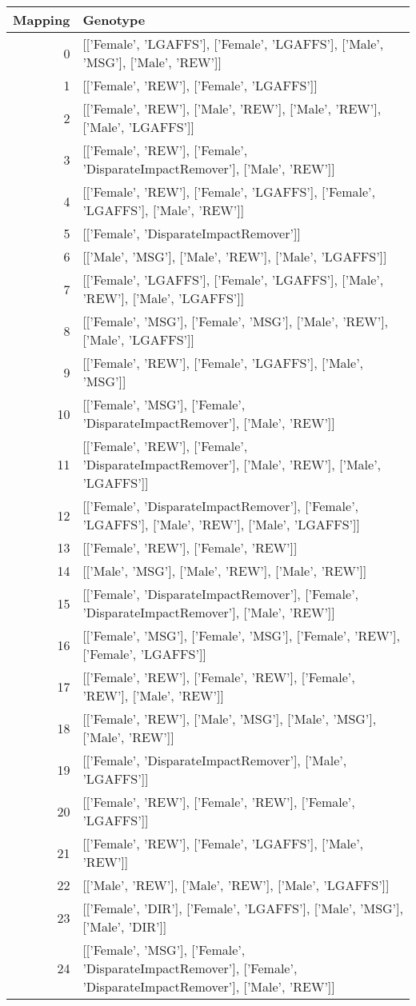 \begin{tabular}{rl}
\toprule
Mapping & Genotype \\
\midrule
0 & [['Female', 'LGAFFS'], ['Female', 'LGAFFS'], ['Male', 'MSG'], ['Male', 'REW']] \\
1 & [['Female', 'REW'], ['Female', 'LGAFFS']] \\
2 & [['Female', 'REW'], ['Male', 'REW'], ['Male', 'REW'], ['Male', 'LGAFFS']] \\
3 & [['Female', 'REW'], ['Female', 'DisparateImpactRemover'], ['Male', 'REW']] \\
4 & [['Female', 'REW'], ['Female', 'LGAFFS'], ['Female', 'LGAFFS'], ['Male', 'REW']] \\
5 & [['Female', 'DisparateImpactRemover']] \\
6 & [['Male', 'MSG'], ['Male', 'REW'], ['Male', 'LGAFFS']] \\
7 & [['Female', 'LGAFFS'], ['Female', 'LGAFFS'], ['Male', 'REW'], ['Male', 'LGAFFS']] \\
8 & [['Female', 'MSG'], ['Female', 'MSG'], ['Male', 'REW'], ['Male', 'LGAFFS']] \\
9 & [['Female', 'REW'], ['Female', 'LGAFFS'], ['Male', 'MSG']] \\
10 & [['Female', 'MSG'], ['Female', 'DisparateImpactRemover'], ['Male', 'REW']] \\
11 & [['Female', 'REW'], ['Female', 'DisparateImpactRemover'], ['Male', 'REW'], ['Male', 'LGAFFS']] \\
12 & [['Female', 'DisparateImpactRemover'], ['Female', 'LGAFFS'], ['Male', 'REW'], ['Male', 'LGAFFS']] \\
13 & [['Female', 'REW'], ['Female', 'REW']] \\
14 & [['Male', 'MSG'], ['Male', 'REW'], ['Male', 'REW']] \\
15 & [['Female', 'DisparateImpactRemover'], ['Female', 'DisparateImpactRemover'], ['Male', 'REW']] \\
16 & [['Female', 'MSG'], ['Female', 'MSG'], ['Female', 'REW'], ['Female', 'LGAFFS']] \\
17 & [['Female', 'REW'], ['Female', 'REW'], ['Female', 'REW'], ['Male', 'REW']] \\
18 & [['Female', 'REW'], ['Male', 'MSG'], ['Male', 'MSG'], ['Male', 'REW']] \\
19 & [['Female', 'DisparateImpactRemover'], ['Male', 'LGAFFS']] \\
20 & [['Female', 'REW'], ['Female', 'REW'], ['Female', 'LGAFFS']] \\
21 & [['Female', 'REW'], ['Female', 'LGAFFS'], ['Male', 'REW']] \\
22 & [['Male', 'REW'], ['Male', 'REW'], ['Male', 'LGAFFS']] \\
23 & [['Female', 'DIR'], ['Female', 'LGAFFS'], ['Male', 'MSG'], ['Male', 'DIR']] \\
24 & [['Female', 'MSG'], ['Female', 'DisparateImpactRemover'], ['Female', 'DisparateImpactRemover'], ['Male', 'REW']] \\
\bottomrule
\end{tabular}
